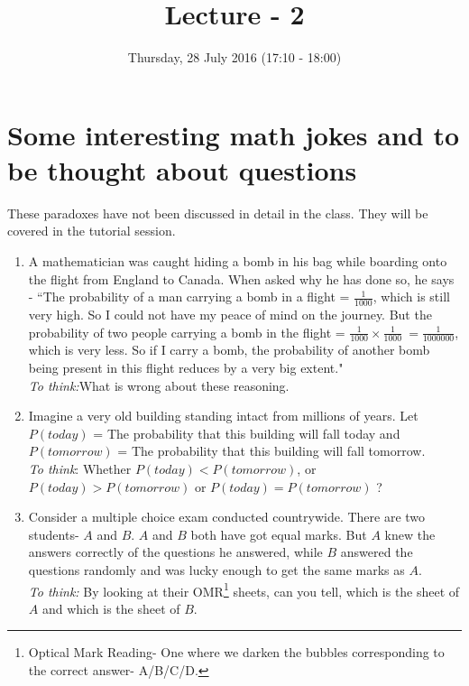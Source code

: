 \documentclass{llncs}
\title{Lecture - 2}
\author{Thursday, 28 July 2016 (17:10 - 18:00)}
\institute{Puzzles : The Online Hiring/ Dating Problem}
\begin{document}
\maketitle


\section{Some interesting math jokes and to be thought about questions}

{\footnotesize These paradoxes have not been discussed in detail in the class. They will be covered in the tutorial session.}

\begin{enumerate}

\item A mathematician was caught hiding a bomb in his bag while boarding onto the flight from England to Canada. When asked why he has done so, he says - ``The probability of a man carrying a bomb in a flight = $\frac{1}{1000}$, which is still very high. So I could not have my peace of mind on the journey. But the probability of two people carrying a bomb in the flight = $\frac{1}{1000} \times \frac{1}{1000}\ = \frac{1}{1000000}$, which is very less. So if I carry a bomb, the probability of another bomb being present in this flight reduces by a very big extent."\\
\textit{To think:}What is wrong about these reasoning. 

\item Imagine a very old building standing intact from millions of years. Let $P(today)$ = The probability that this building will fall today and $P(tomorrow)$ = The probability that this building will fall tomorrow. \\
\textit{To think}: Whether $P(today)<P(tomorrow)$, or $P(today)>P(tomorrow)$ or $P(today)=P(tomorrow)$ ?

\item Consider a multiple choice exam conducted countrywide. There are two students- $A$ and $B$. $A$ and $B$ both have got equal marks. But $A$ knew the answers correctly of the questions he answered, while $B$ answered the questions randomly and was lucky enough to get the same marks as $A$. \\
\textit{To think:} By looking at their OMR\footnote{Optical Mark Reading- One where we darken the bubbles corresponding to the correct answer- A/B/C/D.} sheets, can you tell, which is the sheet of $A$ and which is the sheet of $B$.

\end{enumerate}
\end{document}

